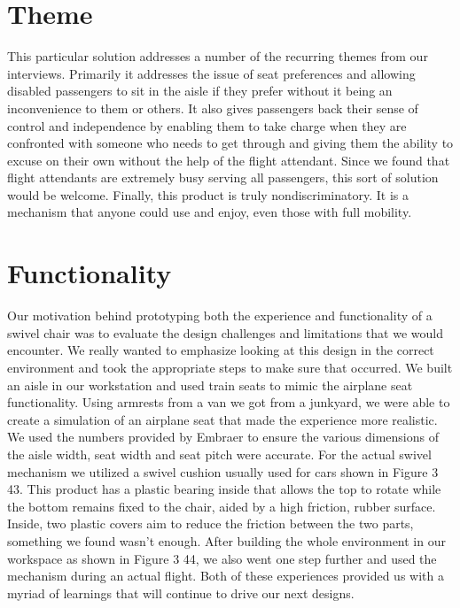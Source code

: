 \section*{Theme}
This particular solution addresses a number of the recurring themes from our interviews. Primarily it addresses the issue of seat preferences and allowing disabled passengers to sit in the aisle if they prefer without it being an inconvenience to them or others. It also gives passengers back their sense of control and independence by enabling them to take charge when they are confronted with someone who needs to get through and giving them the ability to excuse on their own without the help of the flight attendant. Since we found that flight attendants are extremely busy serving all passengers, this sort of solution would be welcome. Finally, this product is truly nondiscriminatory. It is a mechanism that anyone could use and enjoy, even those with full mobility. 

\section*{Functionality}
Our motivation behind prototyping both the experience and functionality of a swivel chair was to evaluate the design challenges and limitations that we would encounter. We really wanted to emphasize looking at this design in the correct environment and took the appropriate steps to make sure that occurred. We built an aisle in our workstation and used train seats to mimic the airplane seat functionality. Using armrests from a van we got from a junkyard, we were able to create a simulation of an airplane seat that made the experience more realistic. We used the numbers provided by Embraer to ensure the various dimensions of the aisle width, seat width and seat pitch were accurate.  For the actual swivel mechanism we utilized a swivel cushion usually used for cars shown in Figure 3 43. This product has a plastic bearing inside that allows the top to rotate while the bottom remains fixed to the chair, aided by a high friction, rubber surface. Inside, two plastic covers aim to reduce the friction between the two parts, something we found wasn’t enough. After building the whole environment in our workspace as shown in Figure 3 44, we also went one step further and used the mechanism during an actual flight. Both of these experiences provided us with a myriad of learnings that will continue to drive our next designs. 

